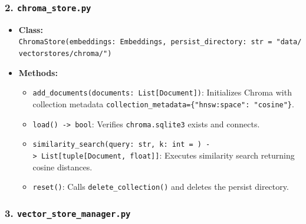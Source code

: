 \documentclass[
]{article}
\providecommand{\tightlist}{%
  \setlength{\itemsep}{0pt}\setlength{\parskip}{0pt}}
\begin{document}
\subsubsection{\texorpdfstring{2.
\texttt{chroma\_\allowbreak store.\allowbreak py}}{2. chroma\_store.py}}\label{chroma_store.py}

\begin{itemize}
\tightlist
\item
  \textbf{Class:}
  \texttt{ChromaStore(\allowbreak embeddings:\ \allowbreak Embeddings,\allowbreak \ \allowbreak persist\_\allowbreak directory:\ \allowbreak str\ \allowbreak =\allowbreak \ \allowbreak "data/\allowbreak vectorstores/\allowbreak chroma/\allowbreak ")\allowbreak }
\item
  \textbf{Methods:}

  \begin{itemize}
  \tightlist
  \item
    \texttt{add\_\allowbreak documents(\allowbreak documents:\ \allowbreak List{[}Document{]})\allowbreak }: Initializes
    Chroma with collection metadata
    \texttt{collection\_\allowbreak metadata=\allowbreak \{"hnsw:space":\ \allowbreak "cosine"\}}.
  \item
    \texttt{load(\allowbreak )\allowbreak \ \allowbreak -\textgreater{}\allowbreak \ \allowbreak bool}: Verifies
    \texttt{chroma.\allowbreak sqlite3} exists and connects.
  \item
    \texttt{similarity\_\allowbreak search(\allowbreak query:\ \allowbreak str,\allowbreak \ \allowbreak k:\ \allowbreak int\ \allowbreak =\allowbreak \ )\allowbreak \ \allowbreak -\textgreater{}\allowbreak \ \allowbreak List{[}tuple{[}Document,\allowbreak \ \allowbreak float{]}{]}}:
    Executes similarity search returning cosine distances.
  \item
    \texttt{reset(\allowbreak )\allowbreak }: Calls \texttt{delete\_\allowbreak collection(\allowbreak )\allowbreak } and deletes
    the persist directory.
  \end{itemize}
\end{itemize}

\subsubsection{\texorpdfstring{3.
\texttt{vector\_\allowbreak store\_\allowbreak manager.\allowbreak py}}{3. vector\_store\_manager.py}}\label{vector_store_manager.py}
\end{document}
